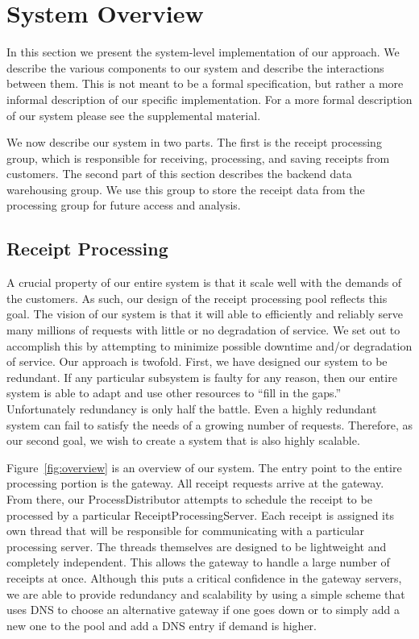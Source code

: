 \section{System Overview}
\label{sec:overview}

In this section we present the system-level implementation of our
approach. We describe the various components to our system and
describe the interactions between them. This is not meant to be a
formal specification, but rather a more informal description of our
specific implementation. For a more formal description of our system
please see the supplemental material.

We now describe our system in two parts. The first is the receipt
processing group, which is responsible for receiving, processing, and
saving receipts from customers. The second part of this section
describes the backend data warehousing group. We use this group to
store the receipt data from the processing group for future access and
analysis.

\subsection{Receipt Processing}
\label{sec:overview.processing}

A crucial property of our entire system is that it scale well with
the demands of the customers. As such, our design of the receipt
processing pool reflects this goal. The vision of our system is that
it will able to efficiently and reliably serve many millions of
requests with little or no degradation of service. We set out to
accomplish this by attempting to minimize possible downtime and/or
degradation of service. Our approach is twofold. First, we have
designed our system to be redundant. If any particular subsystem is
faulty for any reason, then our entire system is able to adapt and use
other resources to ``fill in the gaps.'' Unfortunately redundancy is
only half the battle. Even a highly redundant system can fail to
satisfy the needs of a growing number of requests. Therefore, as our
second goal, we wish to create a system that is also highly scalable.

Figure~\ref{fig:overview} is an overview of our system. The entry
point to the entire processing portion is the gateway. All receipt
requests arrive at the gateway. From there, our ProcessDistributor
attempts to schedule the receipt to be processed by a particular
ReceiptProcessingServer. Each receipt is assigned its own thread that
will be responsible for communicating with a particular processing
server. The threads themselves are designed to be lightweight and
completely independent. This allows the gateway to handle a large
number of receipts at once. Although this puts a critical confidence
in the gateway servers, we are able to provide redundancy and
scalability by using a simple scheme that uses DNS to choose an
alternative gateway if one goes down or to simply add a new one to the
pool and add a DNS entry if demand is higher.

